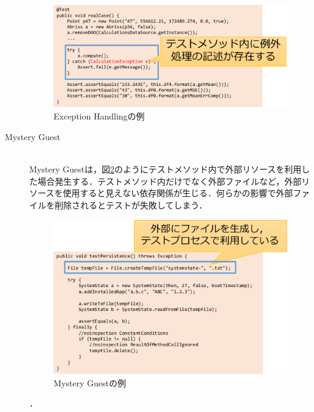 \documentclass[12pt]{jarticle} %
\begin{document}
\begin{description}
\begin{figure}[htbp]
  \begin{center}
    \includegraphics[clip,width=15cm]{EH.pdf}
    \caption{Exception Handlingの例}
    \label{EH}
  \end{center}
\end{figure}

\item[Mystery Guest]~\\
Mystery Guestは，図\ref{MG}のようにテストメソッド内で外部リソースを利用した場合発生する．テストメソッド内だけでなく外部ファイルなど，外部リソースを使用すると見えない依存関係が生じる．何らかの影響で外部ファイルを削除されるとテストが失敗してしまう．

\begin{figure}[htbp]
  \begin{center}
    \includegraphics[clip,width=15cm]{MG.pdf}
    \caption{Mystery Guestの例}
    \label{MG}
  \end{center}
\end{figure}．
\end{description}
\end{document}
